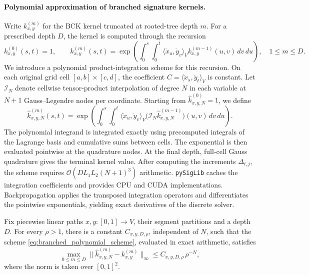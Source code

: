 \paragraph{Polynomial approximation of branched signature kernels.} Write $k_{x,y}^{(m)}$ for the BCK kernel truncated at rooted-tree depth $m$. For a prescribed depth $D$, the kernel is computed through the recursion
\begin{equation}
    k_{x,y}^{(0)}(s,t)=1,\qquad
    k_{x,y}^{(m)}(s,t)
    =\exp\!\left(\int_0^s\int_0^t
        \langle\dot{x}_u,\dot{y}_v\rangle_V
        k_{x,y}^{(m-1)}(u,v)\,dv\,du\right),
    \quad 1\leq m\leq D.
    \label{eq:branched_kernel_depth_recursion}
\end{equation}
We introduce a polynomial product-integration scheme for this recursion. On each original grid cell $[a,b]\times[c,d]$, the coefficient $C=\langle\dot{x}_s,\dot{y}_t\rangle_V$ is constant. Let $\mathcal I_N$ denote cellwise tensor-product interpolation of degree $N$ in each variable at $N+1$ Gauss--Legendre nodes per coordinate. Starting from $\widehat{k}_{x,y,N}^{(0)}=1$, we define
\begin{equation}
    \widehat{k}_{x,y,N}^{(m)}(s,t)
    =\exp\!\left(\int_0^s\int_0^t
        \langle\dot{x}_u,\dot{y}_v\rangle_V
        \bigl(\mathcal I_N\widehat{k}_{x,y,N}^{(m-1)}\bigr)(u,v)\,dv\,du\right).
    \label{eq:branched_polynomial_scheme}
\end{equation}
The polynomial integrand is integrated exactly using precomputed integrals of the Lagrange basis and cumulative sums between cells. The exponential is then evaluated pointwise at the quadrature nodes. At the final depth, full-cell Gauss quadrature gives the terminal kernel value. After computing the increments $\Delta_{i,j}$, the scheme requires $\mathcal{O}(DL_1L_2(N+1)^3)$ arithmetic. \texttt{pySigLib} caches the integration coefficients and provides CPU and CUDA implementations. Backpropagation applies the transposed integration operators and differentiates the pointwise exponentials, yielding exact derivatives of the discrete solver.

\begin{proposition}
    \label{prop:branched_polynomial_convergence}
    Fix piecewise linear paths $x,y:[0,1]\to V$, their segment partitions and a depth $D$. For every $\rho>1$, there is a constant $C_{x,y,D,\rho}$, independent of $N$, such that the scheme \eqref{eq:branched_polynomial_scheme}, evaluated in exact arithmetic, satisfies
    \begin{equation*}
        \max_{0\leq m\leq D}
        \bigl\|\widehat{k}_{x,y,N}^{(m)}-k_{x,y}^{(m)}\bigr\|_{\infty}
        \leq C_{x,y,D,\rho}\,\rho^{-N},
    \end{equation*}
    where the norm is taken over $[0,1]^2$.
\end{proposition}

